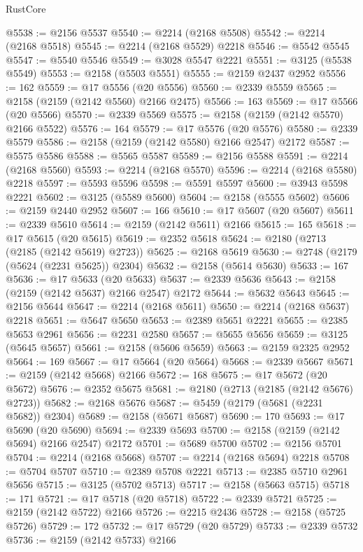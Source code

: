 \begin{lexlean}{RustCore}
\begin{coremodule}
@5538 := @2156 @5537
@5540 := @2214 (@2168 @5508)
@5542 := @2214 (@2168 @5518)
@5545 := @2214 (@2168 @5529) @2218
@5546 := @5542 @5545
@5547 := @5540 @5546
@5549 := @3028 @5547 @2221
@5551 := @3125 (@5538 @5549)
@5553 := @2158 (@5503 @5551)
@5555 := @2159 @2437 @2952
@5556 := 162
@5559 := @17 @5556 (@20 @5556)
@5560 := @2339 @5559
@5565 := @2158 (@2159 (@2142 @5560) @2166 @2475)
@5566 := 163
@5569 := @17 @5566 (@20 @5566)
@5570 := @2339 @5569
@5575 := @2158 (@2159 (@2142 @5570) @2166 @5522)
@5576 := 164
@5579 := @17 @5576 (@20 @5576)
@5580 := @2339 @5579
@5586 := @2158 (@2159 (@2142 @5580) @2166 @2547) @2172
@5587 := @5575 @5586
@5588 := @5565 @5587
@5589 := @2156 @5588
@5591 := @2214 (@2168 @5560)
@5593 := @2214 (@2168 @5570)
@5596 := @2214 (@2168 @5580) @2218
@5597 := @5593 @5596
@5598 := @5591 @5597
@5600 := @3943 @5598 @2221
@5602 := @3125 (@5589 @5600)
@5604 := @2158 (@5555 @5602)
@5606 := @2159 @2440 @2952
@5607 := 166
@5610 := @17 @5607 (@20 @5607)
@5611 := @2339 @5610
@5614 := @2159 (@2142 @5611) @2166
@5615 := 165
@5618 := @17 @5615 (@20 @5615)
@5619 := @2352 @5618
@5624 := @2180 (@2713 (@2185 (@2142 @5619) @2723))
@5625 := @2168 @5619
@5630 := @2748 (@2179 (@5624 (@2231 @5625)) @2304)
@5632 := @2158 (@5614 @5630)
@5633 := 167
@5636 := @17 @5633 (@20 @5633)
@5637 := @2339 @5636
@5643 := @2158 (@2159 (@2142 @5637) @2166 @2547) @2172
@5644 := @5632 @5643
@5645 := @2156 @5644
@5647 := @2214 (@2168 @5611)
@5650 := @2214 (@2168 @5637) @2218
@5651 := @5647 @5650
@5653 := @2389 @5651 @2221
@5655 := @2385 @5653 @2961
@5656 := @2231 @2580
@5657 := @5655 @5656
@5659 := @3125 (@5645 @5657)
@5661 := @2158 (@5606 @5659)
@5663 := @2159 @2325 @2952
@5664 := 169
@5667 := @17 @5664 (@20 @5664)
@5668 := @2339 @5667
@5671 := @2159 (@2142 @5668) @2166
@5672 := 168
@5675 := @17 @5672 (@20 @5672)
@5676 := @2352 @5675
@5681 := @2180 (@2713 (@2185 (@2142 @5676) @2723))
@5682 := @2168 @5676
@5687 := @5459 (@2179 (@5681 (@2231 @5682)) @2304)
@5689 := @2158 (@5671 @5687)
@5690 := 170
@5693 := @17 @5690 (@20 @5690)
@5694 := @2339 @5693
@5700 := @2158 (@2159 (@2142 @5694) @2166 @2547) @2172
@5701 := @5689 @5700
@5702 := @2156 @5701
@5704 := @2214 (@2168 @5668)
@5707 := @2214 (@2168 @5694) @2218
@5708 := @5704 @5707
@5710 := @2389 @5708 @2221
@5713 := @2385 @5710 @2961 @5656
@5715 := @3125 (@5702 @5713)
@5717 := @2158 (@5663 @5715)
@5718 := 171
@5721 := @17 @5718 (@20 @5718)
@5722 := @2339 @5721
@5725 := @2159 (@2142 @5722) @2166
@5726 := @2215 @2436
@5728 := @2158 (@5725 @5726)
@5729 := 172
@5732 := @17 @5729 (@20 @5729)
@5733 := @2339 @5732
@5736 := @2159 (@2142 @5733) @2166

\end{coremodule}
\end{lexlean}

